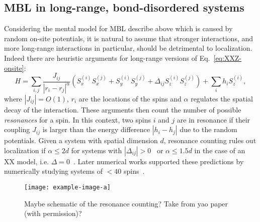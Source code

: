 \subsection{MBL in long-range, bond-disordered systems}
Considering the mental model for MBL describe above which is caused by random on-site potentials, it is natural to assume that stronger interactions, and more long-range interactions in particular, should be detrimental to localization. Indeed there are heuristic arguments for long-range versions of Eq.~\ref{eq:XXZ-onsite}:
\begin{equation}\label{eq:long-range-on-site-XXZ}
	H = \sum_{i,j} \frac{J_{ij}}{|r_i-r_j|^\alpha} \left(S_x^{(i)}S_x^{(j)} + S_y^{(i)}S_y^{(j)} + \Delta_{ij} S_z^{(i)}S_z^{(j)}\right) + \sum_i h_i S_z^{(i)},
\end{equation}
where $|J_{ij}|=O(1)$, $r_i$ are the locations of the spins and $\alpha$ regulates the spatial decay of the interaction. These arguments then count the number of possible \emph{resonances} for a spin. In this context, two spins $i$ and $j$ are in resonance if their coupling $J_{ij}$ is larger than the energy difference $|h_i-h_j|$ due to the random potentials.
Given a system with spatial dimension $d$, resonance counting rules out localization if $\alpha \leq 2d$ for systems with $|\Delta_{ij}| >0$~\cite{burinEnergyDelocalizationStrongly2006,yaoManyBodyLocalizationDipolar2014,burinManybodyDelocalizationStrongly2015,gutmanEnergyTransportAnderson2016} or $\alpha \leq 1.5d$ in the case of an XX model, i.e. $\Delta=0$~\cite{burinLocalizationRandomXY2015}. Later numerical works supported these predictions by numerically studying systems of $< 40$ spins~\cite{schifferManybodyLocalizationSpin2019,safavi-nainiQuantumDynamicsDisordered2019,yousefjaniMobilityEdgeLongrange2023}.


\begin{figure}[htb]
	\centering
	\texttt{[image: example-image-a]}
	\caption{Maybe schematic of the resonance counting? Take from yao paper (with permission)?}
\end{figure}


